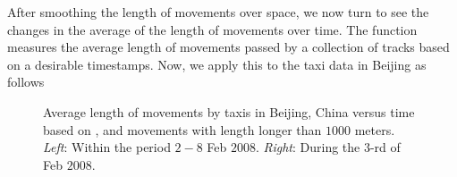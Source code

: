 \documentclass[article]{jss}
\begin{document}
 After smoothing the length of movements over space, we now turn to see the changes in the average of the length of movements over time. The function  measures the average length of movements passed by a collection of tracks based on a desirable timestamps. Now, we apply this to the taxi data in Beijing as follows
\begin{Schunk}
\end{Schunk}
\begin{figure}[!h]
\centering
{}
\caption{Average length of movements by taxis in Beijing, China versus time based on , and movements with length longer than $1000$ meters. \emph{Left}: Within the period $2-8$ Feb $2008$. \emph{Right}: During the $3$-rd of Feb $2008$.}
\label{avemovebijing}
\end{figure}
\end{document}

